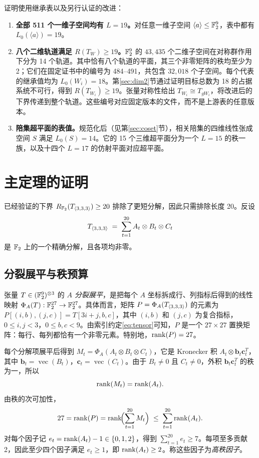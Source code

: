 \documentclass[11pt,a4paper]{article}
\begin{document}
证明使用继承表以及另行认证的改进：
\begin{enumerate}[label=(\roman*)]
  \item\label{it:lines} \textbf{全部 511 个一维子空间均有 $L=19$。}\quad 对任意一维子空间 $\langle a\rangle\le\mathbb{F}_2^9$，表中都有 $L_0(\langle a\rangle)=19$。
  \item\label{it:dim2} \textbf{八个二维轨道满足 $R(T_W)\ge19$。}\quad $\mathbb{F}_2^9$ 的 $43{,}435$ 个二维子空间在对称群作用下分为 14 个轨道。其中恰有八个轨道的平面，其三个非零矩阵的秩均至少为 2；它们在固定证书中的编号为 484--491，共包含 $32{,}018$ 个子空间。每个代表的继承值均为 $L_0(W_i)=18$。第\ref{sec:dim2}节通过证明目标总数为 18 的占据系统不可行，得到 $R(T_{W_i})\ge19$。张量对称性给出 $T_{W_i}\cong T_{gW_i}$，将改进后的下界传递到整个轨道。这些编号对应固定版本的文件，而不是上游表的任意版本。
  \item\label{it:coset} \textbf{陪集超平面的表值。}\quad 规范化后（见第\ref{sec:coset}节），相关陪集的四维线性张成空间 $S$ 满足 $L_0(S)=14$。它的 15 个三维超平面分为一个 $L=15$ 的秩一族，以及十四个 $L=17$ 的仿射平面对应超平面。
\end{enumerate}

\section{主定理的证明}\label{sec:proof}

已经验证的下界 $R_{\mathbb{F}_2}(T_{\langle3,3,3\rangle})\ge20$ 排除了更短分解，因此只需排除长度 20。反设
\begin{equation}\label{eq:decomp}
  T_{\langle3,3,3\rangle} \;=\; \sum_{t=1}^{20} A_t\otimes B_t\otimes C_t
\end{equation}
是 $\mathbb{F}_2$ 上的一个精确分解，且各项均非零。

\subsection{分裂展平与秩预算}\label{sec:flattening}

张量 $T\in(\mathbb{F}_2^9)^{\otimes3}$ 的 \emph{$A$ 分裂展平}，是把每个 $A$ 坐标拆成行、列指标后得到的线性映射 $\Phi_A(T):\mathbb{F}_2^{27}\to\mathbb{F}_2^{27}$。具体而言，矩阵 $P=\Phi_A(T_{\langle3,3,3\rangle})$ 的元素为 $P[(i,b),(j,c)]=T[3i+j,b,c]$，其中 $(i,b)$ 和 $(j,c)$ 为复合指标，$0\le i,j<3$，$0\le b,c<9$。由索引约定\eqref{eq:tensor}可知，$P$ 是一个 $27\times27$ 置换矩阵：每行、每列都恰有一个非零元素。特别地，$\operatorname{rank}(P)=27$。

每个分解项展平后得到 $M_t=\Phi_A(A_t\otimes B_t\otimes C_t)$，它是 Kronecker 积 $A_t\otimes\mathbf{b}_t\mathbf{c}_t^T$，其中 $\mathbf{b}_t=\operatorname{vec}(B_t)$，$\mathbf{c}_t=\operatorname{vec}(C_t)$。由于 $B_t\ne0$ 且 $C_t\ne0$，外积 $\mathbf{b}_t\mathbf{c}_t^T$ 的秩为一，所以
\[
  \operatorname{rank}(M_t) = \operatorname{rank}(A_t).
\]
由秩的次可加性，
\begin{equation}\label{eq:rksum}
  27 = \operatorname{rank}(P) = \operatorname{rank}\!\Bigl(\sum_{t=1}^{20}M_t\Bigr) \;\le\; \sum_{t=1}^{20}\operatorname{rank}(A_t).
\end{equation}
对每个因子记 $e_t=\operatorname{rank}(A_t)-1\in\{0,1,2\}$，得到 $\sum_{t=1}^{20}e_t\ge7$。每项至多贡献 2，因此至少四个因子满足 $e_t\ge1$，即 $\operatorname{rank}(A_t)\ge2$。称这些因子为\emph{高秩因子}。
\end{document}
